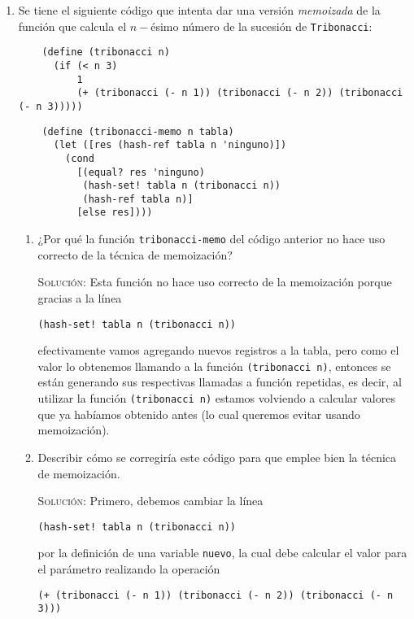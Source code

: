 \documentclass[letterpaper,11pt]{article}
\begin{document}
\begin{enumerate}
    \item Se tiene el siguiente código que intenta dar una versión 
    \textit{memoizada} de la función que calcula el $n-$ésimo número de la 
    sucesión de \texttt{Tribonacci}:
    \begin{verbatim}
    (define (tribonacci n)
      (if (< n 3)
          1
          (+ (tribonacci (- n 1)) (tribonacci (- n 2)) (tribonacci (- n 3)))))
    \end{verbatim}
    \begin{verbatim}
    (define (tribonacci-memo n tabla)
      (let ([res (hash-ref tabla n 'ninguno)])
        (cond
          [(equal? res 'ninguno)
           (hash-set! tabla n (tribonacci n))
           (hash-ref tabla n)]
          [else res])))
    \end{verbatim}

    \begin{enumerate}
        \item ¿Por qué la función \texttt{tribonacci-memo} del código anterior 
        no hace uso correcto de la técnica de memoización?

        \textsc{Solución:} Esta función no hace uso correcto de la memoización
        porque gracias a la línea 
        \begin{center}
            \texttt{(hash-set! tabla n (tribonacci n))}
        \end{center}

        efectivamente vamos agregando nuevos registros a la tabla, pero como 
        el valor lo obtenemos llamando a la función \texttt{(tribonacci n)}, 
        entonces se están generando sus respectivas llamadas a función 
        repetidas, es decir, al utilizar la función \texttt{(tribonacci n)} 
        estamos volviendo a calcular valores que ya habíamos obtenido antes 
        (lo cual queremos evitar usando memoización).

        \item Describir cómo se corregiría este código para que emplee bien la 
        técnica de memoización.
        
        \textsc{Solución:} Primero, debemos cambiar la línea 
        \begin{center}
            \texttt{(hash-set! tabla n (tribonacci n))}    
        \end{center}

        por la definición de una variable \texttt{nuevo}, la cual debe calcular 
        el valor para el parámetro realizando la operación
        \begin{center}
            \texttt{(+ (tribonacci (- n 1)) (tribonacci (- n 2)) 
            (tribonacci (- n 3)))}
        \end{center}
        

\end{enumerate}
\end{enumerate}
\end{document}
